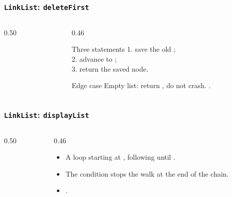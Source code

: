 \documentclass[aspectratio=169,10pt,compress]{beamer}
\begin{document}
\begin{frame}[t,fragile] \frametitle{\texttt{LinkList}: \texttt{deleteFirst}}
  \begin{columns}[T]
    \begin{column}{0.50\textwidth}
    \end{column}
    \begin{column}{0.46\textwidth}
      \begin{block}{Three statements}
        \small
        1. save the old ;\\
        2. advance  to ;\\
        3. return the saved node.
      \end{block}
      \begin{block}{Edge case}
        \small
        Empty list: return , do not crash. .
      \end{block}
    \end{column}
  \end{columns}
\end{frame}




\begin{frame}[t,fragile] \frametitle{\texttt{LinkList}: \texttt{displayList}}
  \begin{columns}[T]
    \begin{column}{0.50\textwidth}
    \end{column}
    \begin{column}{0.46\textwidth}
      \begin{itemize}\small
        \item A  loop starting at ,
              following  until .
        \item The condition  stops the walk at
              the end of the chain.
        \item {}.
      \end{itemize}
    \end{column}
  \end{columns}
\end{frame}
\end{document}
